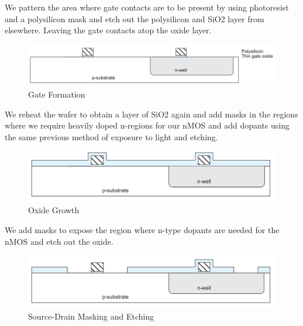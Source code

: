 \noindent\linebreak We pattern the area where gate contacts are to be present by using photoresist and a polysilicon mask and etch out the polysilicon and SiO2 layer from elsewhere. Leaving the gate contacts atop the oxide layer.
\begin{figure}[H]
\centering
\includegraphics[scale=0.3]{./fig13} %
\caption{Gate Formation}
\label{3.13} %
\end{figure}
 
\noindent We reheat the wafer to obtain a layer of SiO2 again and add masks in the regions where we require heavily doped n-regions for our nMOS and add dopants using the same previous method of exposure to light and etching.
\begin{figure}[H]
\centering
\includegraphics[scale=0.3]{./fig14} %
\caption{Oxide Growth }
\label{3.14} %
\end{figure} 
 
\noindent We add masks to expose the region where n-type dopants are needed for the nMOS and etch out the oxide.
\begin{figure}[H]
\centering
\includegraphics[scale=0.3]{./fig15} %
\caption{Source-Drain Masking and Etching}
\label{3.15} %
\end{figure}
 
